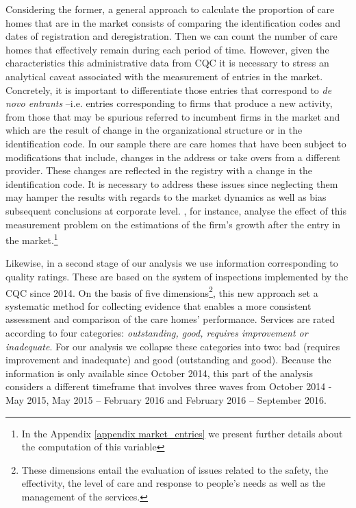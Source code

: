 \documentclass[12pt,letterpaper]{article}
\begin{document}
 
Considering the former, a general approach to calculate the proportion of care
 homes that are in the market consists of comparing the identification codes and dates
  of registration and deregistration. Then we can count the number of care homes that effectively 
  remain during each period of time. However, given the characteristics this administrative data from
   CQC it is necessary to stress an analytical caveat associated with the measurement of entries in the market.
    Concretely, it is important to differentiate those entries that correspond to {\it de novo entrants} –i.e. entries
     corresponding to firms that produce a new activity, from those that may be spurious referred to incumbent
      firms in the market and which are the result of change in the organizational structure or in the identification
       code. In our sample there are care homes that have been subject to modifications that include, changes
        in the address or take overs from a different provider. These changes are reflected in the registry with
         a change in the identification code. It is necessary to address these issues since neglecting them may
          hamper the results with regards to the market dynamics as well as bias subsequent conclusions at
           corporate level. \citet{geurts2016firm}, for instance, analyse the effect of this measurement
            problem on the estimations of the firm’s growth after the entry in the 
            market.\footnote{In the Appendix \ref{appendix market_entries} we present further details about the computation of this variable}
            
   

Likewise, in a second stage of our analysis we use information
corresponding to quality ratings. These are based on the system of inspections 
implemented by the CQC since 2014. On the basis of five 
dimensions\footnote{These dimensions entail the evaluation of issues related to the safety, the effectivity, 
the level of care and response to people’s needs as well as the management of the services.}, this new approach
  set a systematic method for collecting evidence that enables a more consistent assessment and comparison
   of the care homes’ performance. Services are rated according to four categories: {\it outstanding, good, requires
    improvement or inadequate}. For our analysis we collapse these categories into two: bad (requires improvement 
    and inadequate) and good (outstanding and good). Because the information is only available since October 2014, this part of the analysis considers a different
   timeframe that involves three waves from October 2014 - May 2015, May 2015 – February 2016 and 
   February 2016 – September 2016. 
\end{document}
